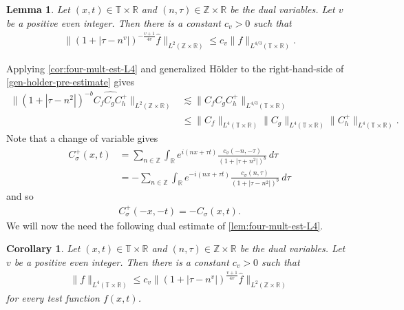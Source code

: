 \documentclass[12pt,reqno]{amsart}
\numberwithin{equation}{section}  %
\numberwithin{figure}{section}
\newcommand{\rr}{\mathbb{R}}
\newcommand{\zz}{\mathbb{Z}}
\newcommand{\ci}{\mathbb{T}}
\newcommand{\wh}{\widehat}
\theoremstyle{plain}
\newtheorem{lemma}{Lemma}
\newtheorem{corollary}{Corollary}
\theoremstyle{definition}
\theoremstyle{remark}
\begin{document}
%
%
%
%
%
%
%
%
\begin{lemma}
	\label{lem:four-mult-est-L4}
	Let $(x, t) \in \ci \times \rr $ and $(n, \tau) \in \zz \times \rr$ be 
	the dual variables. Let $v$ be a positive even integer. Then there is a 
	constant $c_v > 0$ such that
%
%
\begin{equation}
	\label{four-mult-est-L4*}
	\begin{split}
		\| \left( 1 + | \tau - n^v | 
		\right)^{-\frac{v+1}{4v}}
		\wh{f}\|_{L^2(\zz \times \rr)} \le c_v \|f \|_{L^{4/3}( \ci \times \rr)}.
	\end{split}
\end{equation}
%
%
\end{lemma}
%
%
Applying \autoref{cor:four-mult-est-L4} and generalized H\"{o}lder to the 
right-hand-side of \eqref{gen-holder-pre-estimate} gives
%
%
\begin{equation}
	\label{gen-holder-piece-1}
	\begin{split}
		\|\left( 1 + | \tau - n^2 | \right)^{-b} \wh{C_f C_{ 
		g } C^+_{h}}\|_{L^2(\zz \times \rr)}
		& \lesssim  \|C_f C_{g} C^+_{h} \|_{L^{4/3}(\ci \times \rr)}
		\\
		& \le \|C_f \|_{L^4(\ci \times \rr)} \|C_{g}\|_{L^4(\ci \times \rr)} 
		\|C^+_{h}\|_{L^4(\ci \times \rr)}.
	\end{split}
\end{equation}
%
%
Note that a change of variable gives
%
%
\begin{equation*}
	\begin{split}
		C_\sigma^+(x, t)
		& = \sum_{n \in \zz} \int_\rr e^{i(nx +  \tau t)} \frac{c_\sigma\left( -n, -\tau \right)}{\left( 
		1 + | \tau + n^2 | \right)^{b}} \ d \tau
		\\
		& = - \sum_{n \in \zz} \int_\rr e^{-i(nx +   \tau t )}
		\frac{c_\sigma\left( n, \tau \right)}{\left( 
		1 + | \tau - n^2 | \right)^{b}} \ d \tau
	\end{split}
\end{equation*}
%
%
and so
%
%
\begin{equation*}
	\begin{split}
		C_\sigma^+(-x, -t) = -C_\sigma(x, t).
	\end{split}
\end{equation*}
%
%
We will now the need the following dual estimate of
\autoref{lem:four-mult-est-L4}.
%
\begin{corollary}
	\label{cor:four-mult-est-L4}
	Let $(x, t) \in \ci \times \rr $ and $(n, \tau) \in \zz \times \rr$ be 
	the dual variables. Let $v$ be a positive even integer. Then there is a 
	constant $c_v > 0$ such that
%
%
\begin{equation}
	\label{four-mult-est-L4}
	\begin{split}
		\|f\|_{L^4(\ci \times \rr)} \le c_v \|\left( 1 + | \tau - n^v | 
		\right)^\frac{v+1}{4v} \wh{f} \|_{L^2( \zz \times \rr)}
	\end{split}
\end{equation}
for every test function $f(x, t)$. 
%
%
%
%
\end{corollary}
\end{document}
